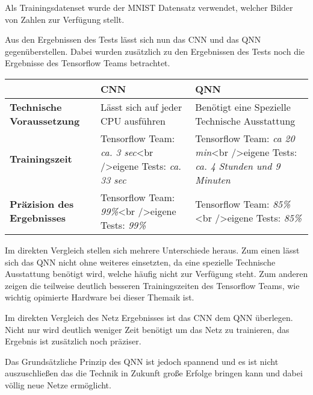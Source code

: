 \documentclass[
]{article}
\begin{document}
Als Trainingsdatenset wurde der MNIST Datensatz verwendet, welcher
Bilder von Zahlen zur Verfügung stellt.

Aus den Ergebnissen des Tests lässt sich nun das CNN und das QNN
gegenüberstellen. Dabei wurden zusätzlich zu den Ergebnissen des Tests
noch die Ergebnisse des Tensorflow Teams betrachtet.

\begin{longtable}[]{@{}lll@{}}
\toprule
& CNN & QNN\tabularnewline
\midrule
\endhead
\textbf{Technische Voraussetzung} & Lässt sich auf jeder CPU ausführen &
Benötigt eine Spezielle Technische Ausstattung\tabularnewline
\textbf{Trainingszeit} & Tensorflow Team: \emph{ca. 3 sec}\textless br
/\textgreater{}eigene Tests: \emph{ca. 33 sec} & Tensorflow Team:
\emph{ca 20 min}\textless br /\textgreater{}eigene Tests: \emph{ca. 4
Stunden und 9 Minuten}\tabularnewline
\textbf{Präzision des Ergebnisses} & Tensorflow Team:
\emph{99\%}\textless br /\textgreater{}eigene Tests: \emph{99\%} &
Tensorflow Team: \emph{85\%}\textless br /\textgreater{}eigene Tests:
\emph{85\%}\tabularnewline
\bottomrule
\end{longtable}

Im direkten Vergleich stellen sich mehrere Unterschiede heraus. Zum
einen lässt sich das QNN nicht ohne weiteres einsetzten, da eine
spezielle Technische Ausstattung benötigt wird, welche häufig nicht zur
Verfügung steht. Zum anderen zeigen die teilweise deutlich besseren
Trainingszeiten des Tensorflow Teams, wie wichtig opimierte Hardware bei
dieser Themaik ist.

Im direkten Vergleich des Netz Ergebnisses ist das CNN dem QNN
überlegen. Nicht nur wird deutlich weniger Zeit benötigt um das Netz zu
trainieren, das Ergebnis ist zusätzlich noch präziser.

Das Grundsätzliche Prinzip des QNN ist jedoch spannend und es ist nicht
auszuschließen das die Technik in Zukunft große Erfolge bringen kann und
dabei völlig neue Netze ermöglicht.
\end{document}

